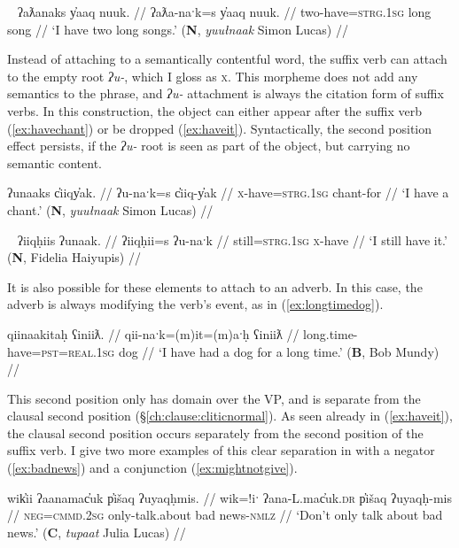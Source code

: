 \ex~ \label{ex:havetwolongsongs}
\begingl
\glpreamble ʔaƛanaks y̓aaq nuuk. //
\gla ʔaƛa-naˑk=s y̓aaq nuuk. //
\glb two-have=\textsc{strg.1sg} long song //
\glft `I have two long songs.' (\textbf{N}, \textit{yuułnaak} Simon Lucas) //
\endgl
\xe

Instead of attaching to a semantically contentful word, the suffix verb can attach to the empty root \textit{ʔu-}, which I gloss as \textsc{x}. This morpheme does not add any semantics to the phrase, and \textit{ʔu-} attachment is always the citation form of suffix verbs. In this construction, the object can either appear after the suffix verb (\ref{ex:havechant}) or be dropped (\ref{ex:haveit}). Syntactically, the second position effect persists, if the \textit{ʔu-} root is seen as part of the object, but carrying no semantic content.

\ex \label{ex:havechant}
\begingl
\glpreamble ʔunaaks c̓iiqy̓ak. //
\gla ʔu-naˑk=s c̓iiq-y̓ak //
\glb \textsc{x}-have=\textsc{strg.1sg} chant-for //
\glft `I have a chant.' (\textbf{N}, \textit{yuułnaak} Simon Lucas) //
\endgl
\xe

\ex~ \label{ex:haveit}
\begingl
\glpreamble ʔiiqḥiis ʔunaak. //
\gla ʔiiqḥii=s ʔu-naˑk //
\glb still=\textsc{strg.1sg} \textsc{x}-have //
\glft `I still have it.' (\textbf{N}, Fidelia Haiyupis) //
\endgl
\xe

It is also possible for these elements to attach to an adverb. In this case, the adverb is always modifying the verb's event, as in (\ref{ex:longtimedog}).

\ex \label{ex:longtimedog}
\begingl
\glpreamble qiinaakitaḥ ʕiniiƛ. //
\gla qii-naˑk=(m)it=(m)aˑḥ ʕiniiƛ //
\glb long.time-have=\textsc{pst}=\textsc{real.1sg} dog //
\glft `I have had a dog for a long time.' (\textbf{B}, Bob Mundy) //
\endgl
\xe

This second position only has domain over the VP, and is separate from the clausal second position (\S\ref{ch:clause:cliticnormal}). As seen already in (\ref{ex:haveit}), the clausal second position occurs separately from the second position of the suffix verb. I give two more examples of this clear separation in with a negator (\ref{ex:badnews}) and a conjunction (\ref{ex:mightnotgive}).


\ex \label{ex:badnews}
\begingl
\glpreamble wik̓ii ʔaanamac̓uk p̓išaq ʔuyaqḥmis. //
\gla wik=!iˑ ʔana-L.mac̓uk.\textsc{dr} p̓išaq ʔuyaqḥ-mis //
\glb \textsc{neg}=\textsc{cmmd.2sg} only-talk.about bad news-\textsc{nmlz} //
\glft `Don't only talk about bad news.' (\textbf{C}, \textit{tupaat} Julia Lucas) //
\endgl
\xe

